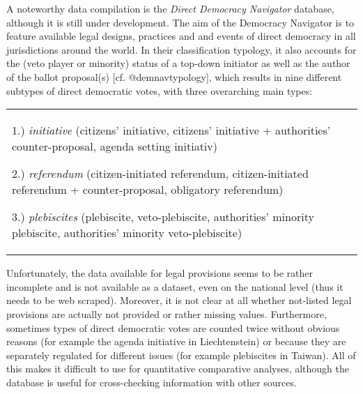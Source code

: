 \documentclass[]{article}
\begin{document}
A noteworthy data compilation is the \emph{Direct Democracy Navigator}
database, although it is still under development. The aim of the
Democracy Navigator is to feature available legal designs, practices and
and events of direct democracy in all jurisdictions around the world. In
their classification typology, it also accounts for the (veto player or
minority) status of a top-down initiator as well as the author of the
ballot proposal(s) {[}cf. @demnavtypology{]}, which results in nine
different subtypes of direct democratic votes, with three overarching
main types:

\vspace{0.2cm}

\begin{tabular}{p{13.5cm}}
    1.) \textit{initiative} (citizens' initiative, citizens' initiative + authorities' counter-proposal, agenda setting initiativ)
    
    2.) \textit{referendum} (citizen-initiated referendum, citizen-initiated referendum + counter-proposal, obligatory referendum)
    
    3.) \textit{plebiscites} (plebiscite, veto-plebiscite, authorities' minority plebiscite, authorities' minority veto-plebiscite)
    
\end{tabular}

Unfortunately, the data available for legal provisions seems to be
rather incomplete and is not available as a dataset, even on the
national level (thus it needs to be web scraped). Moreover, it is not
clear at all whether not-listed legal provisions are actually not
provided or rather missing values. Furthermore, sometimes types of
direct democratic votes are counted twice without obvious reasons (for
example the agenda initiative in Liechtenstein) or because they are
separately regulated for different issues (for example plebiscites in
Taiwan). All of this makes it difficult to use for quantitative
comparative analyses, although the database is useful for cross-checking
information with other sources.
\end{document}
